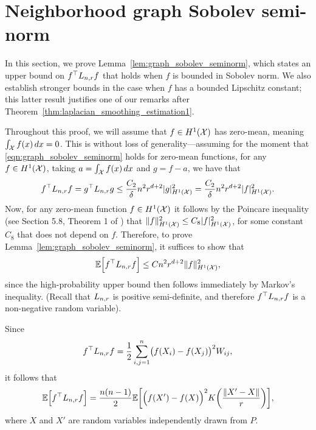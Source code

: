 \section{Neighborhood graph Sobolev semi-norm}
\label{sec:graph_sobolev_seminorm}

In this section, we prove Lemma~\ref{lem:graph_sobolev_seminorm}, which states an upper bound on $f^{\top} L_{n,r} f$ that holds when $f$ is bounded in Sobolev norm. We also establish stronger bounds in the case when $f$ has a bounded Lipschitz constant; this latter result justifies one of our remarks after Theorem~\ref{thm:laplacian_smoothing_estimation1}. 

Throughout this proof, we will assume that $f \in H^1(\mathcal{X})$ has zero-mean, meaning $\int_{\mathcal{X}} f(x) \,dx = 0$. This is without loss of generality---assuming for the moment that \eqref{eqn:graph_sobolev_seminorm} holds for zero-mean functions, for any $f \in H^1(\mathcal{X})$, taking $a = \int_{\mathcal{X}} f(x) \,dx$ and $g = f - a$, we have that
\begin{equation*}
f^{\top} L_{n,r} f = g^{\top} L_{n,r} g \leq \frac{C_2}{\delta} n^2 r^{d + 2} |g|_{H^1(\mathcal{X})}^2 = \frac{C_2}{\delta} n^2 r^{d + 2} |f|_{H^1(\mathcal{X})}^2.
\end{equation*} 
Now, for any zero-mean function $f \in H^1(\mathcal{X})$ it follows by the Poincare inequality (see Section 5.8, Theorem 1 of \citet{evans10}) that $\|f\|_{H^1(\mathcal{X})}^2 \leq C_8 |f|_{H^1(\mathcal{X})}^2$, for some constant $C_8$ that does not depend on $f$. Therefore, to prove Lemma~\ref{lem:graph_sobolev_seminorm}, it suffices to show that
\begin{equation*}
\mathbb{E}\Bigl[f^{\top} L_{n,r} f\Bigr] \leq C n^2 r^{d + 2} \|f\|_{H^1(\mathcal{X})}^2,
\end{equation*}
since the high-probability upper bound then follows immediately by Markov's inequality. (Recall that $L_{n,r}$ is positive semi-definite, and therefore $f^{\top} L_{n,r} f$ is a non-negative random variable).

Since
\begin{equation*}
f^{\top} L_{n,r} f = \frac{1}{2}\sum_{i, j = 1}^{n} \bigl(f(X_i) - f(X_j)\bigr)^2 W_{ij},
\end{equation*}
it follows that
\begin{equation}
\label{pf:first_order_graph_sobolev_seminorm_1}
\mathbb{E}\Bigl[f^{\top} L_{n,r} f\Bigr] = \frac{n(n - 1)}{2} \mathbb{E}\biggl[\Bigl(f(X') - f(X)\Bigr)^2 K\biggl(\frac{\|X' - X\|}{r}\biggr)\biggr],
\end{equation}
where $X$ and $X'$ are random variables independently drawn from $P$.


